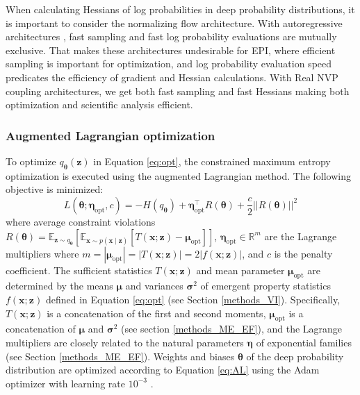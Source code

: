 \documentclass[11pt]{article}
\begin{document}
When calculating Hessians of log probabilities in deep probability distributions, it is important to consider the normalizing flow architecture.
With autoregressive architectures \cite{kingma2016improved, papamakarios2017masked}, fast sampling and fast log probability evaluations are mutually exclusive.
That makes these architectures undesirable for EPI, where efficient sampling is important for optimization, and log probability evaluation speed predicates the efficiency of gradient and Hessian calculations.
With Real NVP coupling architectures, we get both fast sampling and fast Hessians making both optimization and scientific analysis efficient.

\subsubsection{Augmented Lagrangian optimization}\label{methods_AL_opt}
To optimize $q_{\bm{\theta}}(\mathbf{z})$ in Equation \ref{eq:opt}, the constrained maximum entropy optimization is executed using the augmented Lagrangian method.  
The following objective is minimized:
\begin{equation} \label{eq:AL}
L(\bm{\theta}; \bm{\eta}_{\text{opt}}, c) = -H(q_{\bm{\theta}}) + \bm{\eta}_{\text{opt}}^\top R(\bm{\theta}) + \frac{c}{2}||R(\bm{\theta})||^2
\end{equation}
where average constraint violations $R(\bm{\theta}) = \mathbb{E}_{\mathbf{z} \sim q_{\bm{\theta}}}\left[ \mathbb{E}_{\mathbf{x}\sim p(\mathbf{x} \mid \mathbf{z})}\left[T(\mathbf{x}; \mathbf{z}) - \bm{\mu}_{\text{opt}} \right] \right]$, $\bm{\eta}_{\text{opt}} \in \mathbb{R}^m$ are the Lagrange multipliers where $m = |\bm{\mu}_{\text{opt}}| = |T(\mathbf{x}; \mathbf{z})| = 2|f(\mathbf{x}; \mathbf{z})|$,  and $c$ is the penalty coefficient. 
The sufficient statistics $T(\mathbf{x}; \mathbf{z})$ and mean parameter $\bm{\mu}_{\text{opt}}$ are determined by the means $\bm{\mu}$ and variances $\bm{\sigma}^2$ of emergent property statistics $f(\mathbf{x}; \mathbf{z})$ defined in Equation \ref{eq:opt} (see Section \ref{methods_VI}).
Specifically, $T(\mathbf{x}; \mathbf{z})$ is a concatenation of the first and second moments, $\bm{\mu}_{\text{opt}}$ is a concatenation of $\bm{\mu}$ and $\bm{\sigma}^2$ (see section \ref{methods_ME_EF}), and the Lagrange multipliers are closely related to the natural parameters $\bm{\eta}$ of exponential families (see Section \ref{methods_ME_EF}).
Weights and biases $\bm{\theta}$ of the deep probability distribution are optimized according to Equation \ref{eq:AL} using the Adam optimizer with learning rate $10^{-3}$ \cite{kingma2014adam}.
\end{document}
